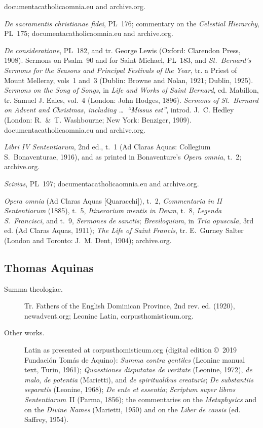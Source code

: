 \begin{description}
  \mbox{documentacatholicaomnia.eu} and archive.org.
\item[Hugh of Saint Victor.] \emph{De sacramentis christianae fidei}, PL~176;
  commentary on the \emph{Celestial Hierarchy}, PL~175;
  \mbox{documentacatholicaomnia.eu} and archive.org.
\item[Bernard of Clairvaux.] \emph{De consideratione}, PL~182, and tr.
  George Lewis (Oxford: Clarendon Press, 1908). Sermons on Psalm~90 and
  for Saint Michael, PL~183, and \emph{St.\ Bernard's Sermons for the
  Seasons and Principal Festivals of the Year}, tr. a Priest of Mount
  Melleray, vols~1 and~3 (Dublin: Browne and Nolan, 1921; Dublin, 1925).
  \emph{Sermons on the Song of Songs}, in \emph{Life and Works of Saint
  Bernard}, ed. Mabillon, tr. Samuel J. Eales, vol.~4 (London: John
  Hodges, 1896). \emph{Sermons of St.\ Bernard on Advent and Christmas,
  including \ldots\ ``Missus est''}, introd. J.~C. Hedley (London:
  R.~\&~T. Washbourne; New York: Benziger, 1909).
  \mbox{documentacatholicaomnia.eu} and archive.org.
\item[Peter Lombard.] \emph{Libri IV Sententiarum}, 2nd ed., t.~1 (Ad
  Claras Aquas: Collegium S.~Bonaventurae, 1916), and as printed in
  Bonaventure's \emph{Opera omnia}, t.~2; archive.org.
\item[Hildegard of Bingen.] \emph{Scivias}, PL~197;
  \mbox{documentacatholicaomnia.eu} and archive.org.
\item[Bonaventure.] \emph{Opera omnia} (Ad Claras Aquas [Quaracchi]),
  t.~2, \emph{Commentaria in II Sententiarum} (1885), t.~5,
  \emph{Itinerarium mentis in Deum}, t.~8, \emph{Legenda S.~Francisci}, and
  t.~9, \emph{Sermones de sanctis}; \emph{Breviloquium}, in \emph{Tria
  opuscula}, 3rd ed. (Ad Claras Aquas, 1911); \emph{The Life of Saint
  Francis}, tr. E.~Gurney Salter (London and Toronto: J.~M. Dent, 1904);
  archive.org.
\end{description}

\subsection*{Thomas Aquinas}
\begin{description}
\item[Summa theologiae.] Tr. Fathers of the English Dominican Province,
  2nd rev. ed. (1920), newadvent.org; Leonine Latin, corpusthomisticum.org.
\item[Other works.] Latin as presented at corpusthomisticum.org (digital
  edition \copyright~2019 Fundación Tomás de Aquino): \emph{Summa contra
  gentiles} (Leonine manual text, Turin, 1961); \emph{Quaestiones
  disputatae de veritate} (Leonine, 1972), \emph{de malo}, \emph{de
  potentia} (Marietti), and \emph{de spiritualibus creaturis}; \emph{De
  substantiis separatis} (Leonine, 1968); \emph{De ente et essentia};
  \emph{Scriptum super libros Sententiarum}~II (Parma, 1856); the
  commentaries on the \emph{Metaphysics} and on the \emph{Divine Names}
  (Marietti, 1950) and on the \emph{Liber de causis} (ed. Saffrey, 1954).
\end{description}

